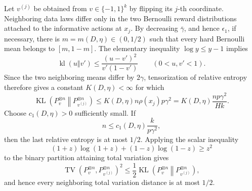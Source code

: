 Let \(v^{(j)}\) be obtained from \(v\in\{-1,1\}^k\) by flipping its \(j\)-th coordinate. Neighboring data laws differ only in the two Bernoulli reward distributions attached to the informative actions at \(x_j\). By decreasing \(\bar\gamma\), and hence \(\epsilon_1\), if necessary, there is \(m=m(D,\eta)\in(0,1/2)\) such that every hard Bernoulli mean belongs to \([m,1-m]\). The elementary inequality \(\log y\le y-1\) implies
\[
\operatorname{kl}(u\Vert v')
\le\frac{(u-v')^2}{v'(1-v')}
\qquad(0<u,v'<1).
\]
Since the two neighboring means differ by \(2\gamma\), tensorization of relative entropy therefore gives a constant \(K(D,\eta)<\infty\) for which
\[
\operatorname{KL}\!\left(P_v^{\otimes n}\middle\Vert P_{v^{(j)}}^{\otimes n}\right)
\le K(D,\eta)n\rho(x_j)p\gamma^2
=K(D,\eta)\frac{np\gamma^2}{Hk}.
\]
Choose \(c_1(D,\eta)>0\) sufficiently small. If
\[
n\le c_1(D,\eta)\frac{k}{p\gamma^2},
\]
then the last relative entropy is at most \(1/2\). Applying the scalar inequality
\[
(1+z)\log(1+z)+(1-z)\log(1-z)\ge z^2
\]
to the binary partition attaining total variation gives
\[
\operatorname{TV}\!\left(P_v^{\otimes n},P_{v^{(j)}}^{\otimes n}\right)^2
\le\frac12\operatorname{KL}\!\left(P_v^{\otimes n}\middle\Vert P_{v^{(j)}}^{\otimes n}\right),
\]
and hence every neighboring total variation distance is at most \(1/2\).

